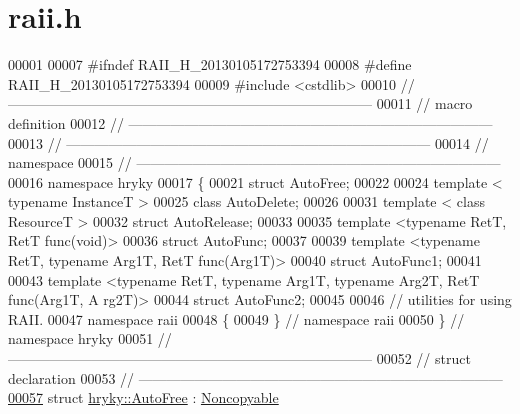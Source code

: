 \hypertarget{raii_8h_source}{\section{raii.\-h}
}

\begin{DoxyCode}
00001 
00007 \textcolor{preprocessor}{#ifndef RAII\_H\_20130105172753394}
00008 \textcolor{preprocessor}{}\textcolor{preprocessor}{#define RAII\_H\_20130105172753394}
00009 \textcolor{preprocessor}{}\textcolor{preprocessor}{#include <cstdlib>}
00010 \textcolor{comment}{//
      ------------------------------------------------------------------------------}
00011 \textcolor{comment}{// macro definition}
00012 \textcolor{comment}{//
      ------------------------------------------------------------------------------}
00013 \textcolor{comment}{//
      ------------------------------------------------------------------------------}
00014 \textcolor{comment}{// namespace}
00015 \textcolor{comment}{//
      ------------------------------------------------------------------------------}
00016 \textcolor{keyword}{namespace }hryky
00017 \{
00021     \textcolor{keyword}{struct }AutoFree;
00022 
00024     \textcolor{keyword}{template} < \textcolor{keyword}{typename} InstanceT >
00025     \textcolor{keyword}{class }AutoDelete;
00026     
00031     \textcolor{keyword}{template} < \textcolor{keyword}{class} ResourceT >
00032     \textcolor{keyword}{struct }AutoRelease;
00033 
00035     \textcolor{keyword}{template} <\textcolor{keyword}{typename} RetT, RetT func(\textcolor{keywordtype}{void})>
00036     \textcolor{keyword}{struct }AutoFunc;
00037     
00039     \textcolor{keyword}{template} <\textcolor{keyword}{typename} RetT, \textcolor{keyword}{typename} Arg1T, RetT func(Arg1T)>
00040     \textcolor{keyword}{struct }AutoFunc1;
00041     
00043     \textcolor{keyword}{template} <\textcolor{keyword}{typename} RetT, \textcolor{keyword}{typename} Arg1T, \textcolor{keyword}{typename} Arg2T, RetT func(Arg1T, A
      rg2T)>
00044     \textcolor{keyword}{struct }AutoFunc2;
00045 
00046 \textcolor{comment}{// utilities for using RAII.}
00047 \textcolor{keyword}{namespace }raii
00048 \{
00049 \} \textcolor{comment}{// namespace raii}
00050 \} \textcolor{comment}{// namespace hryky}
00051 \textcolor{comment}{//
      ------------------------------------------------------------------------------}
00052 \textcolor{comment}{// struct declaration}
00053 \textcolor{comment}{//
      ------------------------------------------------------------------------------}
\hypertarget{raii_8h_source_l00057}{}\hyperlink{structhryky_1_1_auto_free}{00057} \textcolor{comment}{}\textcolor{keyword}{struct }\hyperlink{structhryky_1_1_auto_free}{hryky::AutoFree} : \hyperlink{classhryky_1_1_noncopyable}{Noncopyable}

\end{DoxyCode}
